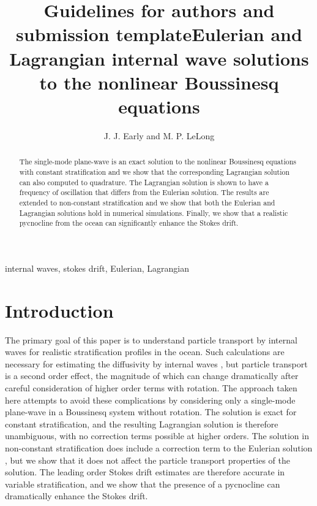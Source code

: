 \documentclass{jfm}
\title{Guidelines for authors and submission template}
\author{J. J. Early\aff{1}
  \corresp{\email{jearly@nwra.com}} and
  M. P. LeLong\aff{1} }
\affiliation{\aff{1}NorthWest Research Associates, 4118 148th Ave NE, Redmond, WA 98052}
\title{Eulerian and Lagrangian internal wave solutions to the nonlinear Boussinesq equations}
\begin{document}
\maketitle

\begin{abstract}
The single-mode plane-wave is an exact solution to the nonlinear Boussinesq equations with constant stratification and we show that the corresponding Lagrangian solution can also computed to quadrature. The Lagrangian solution is shown to have a frequency of oscillation that differs from the Eulerian solution. The results are extended to non-constant stratification and we show that both the Eulerian and Lagrangian solutions hold in numerical simulations. Finally, we show that a realistic pycnocline from the ocean can significantly enhance the Stokes drift.
\end{abstract}

\begin{keywords}
internal waves, stokes drift, Eulerian, Lagrangian
\end{keywords}

%
\section{Introduction}
%

The primary goal of this paper is to understand particle transport by internal waves for realistic stratification profiles in the ocean. Such calculations are necessary for estimating the diffusivity by internal waves \citep{holmescerfon2011-jfm}, but particle transport is a second order effect, the magnitude of which can change dramatically after careful consideration of higher order terms with rotation. The approach taken here attempts to avoid these complications by considering only a single-mode plane-wave in a Boussinesq system without rotation. The solution is exact for constant stratification, and the resulting Lagrangian solution is therefore unambiguous, with no correction terms possible at higher orders. The solution in non-constant stratification does include a correction term to the Eulerian solution \citep{thorpe1968}, but we show that it does not affect the particle transport properties of the solution. The leading order Stokes drift estimates are therefore accurate in variable stratification, and we show that the presence of a pycnocline can dramatically enhance the Stokes drift.
\end{document}
